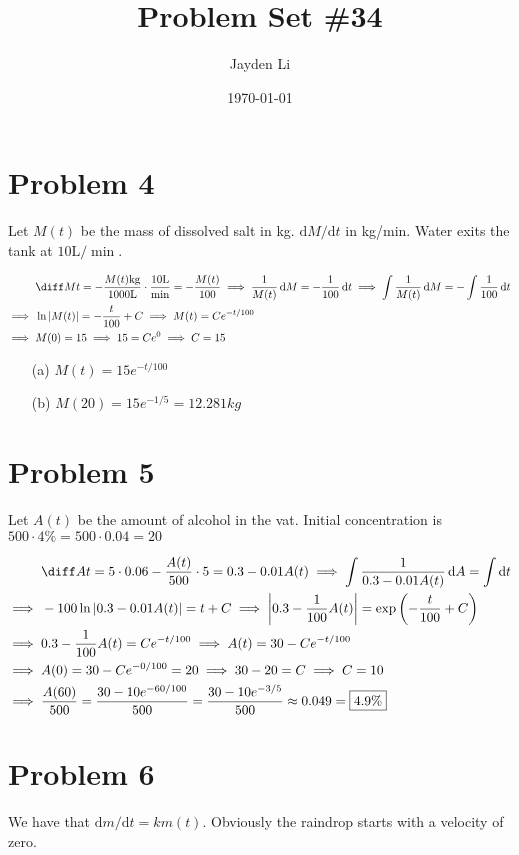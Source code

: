 \documentclass[preview, margin=0.6in]{standalone}
\title{\vspace*{-30pt}Problem Set \#34}
\author{Jayden Li}
\date{\today}
\newcommand*{\problem}[1]{\section*{Problem #1}}
\begin{document}
\fontsize{12pt}{12pt}\selectfont
\setlength{\abovedisplayskip}{0pt}
\maketitle

\problem{4}
Let $M(t)$ be the mass of dissolved salt in kg. $\mathrm{d}M/\mathrm{d}t$ in kg/min. Water exits the tank at $10\si{\liter}/\si{\min}$.

$\begin{aligned}[t]
	&\diff Mt=-\frac{M(t)\si{\kilo\gram}}{1000\si{\liter}}\cdot \frac{10\si{\liter}}{\min}=-\frac{M(t)}{100}
	\implies \frac{1}{M(t)}\,\mathrm{d}M=-\frac{1}{100}\,\mathrm{d}t
	\implies \int\frac{1}{M(t)}\,\mathrm{d}M=-\int\frac{1}{100}\,\mathrm{d}t \\
	\implies{}&\ln|M(t)|=-\frac{t}{100}+C
	\implies M(t)=Ce^{-t/100} \\
	\implies{}&M(0)=15
	\implies 15=Ce^0
	\implies C=15
\end{aligned}$

\begin{itemize}
	\item[(a)] $\displaystyle M(t)=15e^{-t/100}$
	\item[(b)] $\displaystyle M(20)=15e^{-1/5}=12.281\si{kg}$
\end{itemize}

\problem{5}
Let $A(t)$ be the amount of alcohol in the vat. Initial concentration is $500\cdot 4\%=500\cdot0.04=20$

$\begin{aligned}[t]
	&\diff At=5\cdot0.06-\frac{A(t)}{500}\cdot5=0.3-0.01A(t)
	\implies \int \frac{1}{0.3-0.01A(t)}\,\mathrm{d}A=\int \mathrm{d}t \\
	\implies{}& -100\ln|0.3-0.01A(t)|=t+C
	\implies \left|0.3-\frac{1}{100}A(t)\right|=\exp \left(-\frac{t}{100}+C\right) \\
	\implies{}& 0.3-\frac{1}{100}A(t)=Ce^{-t/100}
	\implies A(t)=30-Ce^{-t/100} \\
	\implies{}& A(0)=30-Ce^{-0/100}=20
	\implies 30-20=C
	\implies C=10 \\
	\implies{}&\frac{A(60)}{500}=\frac{30-10e^{-60/100}}{500}
	=\frac{30-10e^{-3/5}}{500}
	\approx 0.049
	=\boxed{4.9\%}
\end{aligned}$

\problem{6}
We have that $\mathrm{d}m/\mathrm{d}t=km(t)$. Obviously the raindrop starts with a velocity of zero.
\end{document}
